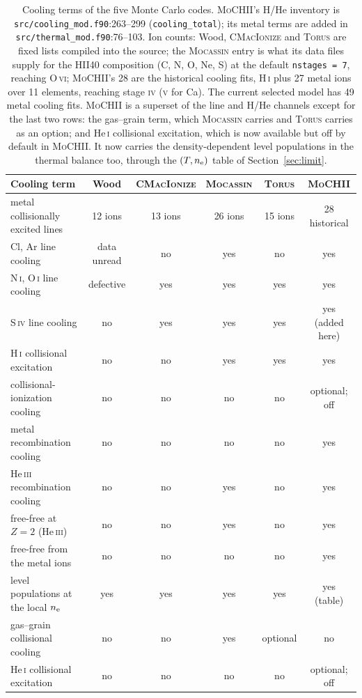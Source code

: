 \documentclass[english,a4paper]{my_memo}
\newcommand{\code}[1]{\texttt{#1}}
\newcommand{\MoCHII}{\textsc{MoCHII}}
\newcommand{\Mocassin}{\textsc{Mocassin}}
\newcommand{\CMI}{\textsc{CMacIonize}}
\newcommand{\Torus}{\textsc{Torus}}
\newcommand{\HI}{H\,\textsc{i}}
\newcommand{\HeI}{He\,\textsc{i}}
\newcommand{\HeIII}{He\,\textsc{iii}}
\newcommand{\OI}{O\,\textsc{i}}
\newcommand{\NI}{N\,\textsc{i}}
\newcommand{\SIV}{S\,\textsc{iv}}
\newcommand{\nel}{n_{\rm e}}
\begin{document}
\begin{table}[htbp]
\centering
\caption{Cooling terms of the five Monte Carlo codes.  \MoCHII{}'s H/He
inventory is \code{src/cooling\_mod.f90}:263--299 (\code{cooling\_total});
its metal terms are added in \code{src/thermal\_mod.f90}:76--103.  Ion counts: Wood, \CMI{}
and \Torus{} are fixed lists compiled into the source; the \Mocassin{} entry is
what its data files supply for
the HII40 composition (C, N, O, Ne, S) at the default \code{nstages = 7},
reaching O\,\textsc{vi}; \MoCHII{}'s 28 are the historical cooling fits,
\HI{} plus 27 metal ions over 11 elements, reaching stage \textsc{iv}
(\textsc{v} for Ca). The current selected model has 49 metal cooling fits.
\MoCHII{} is a superset of the line and
H/He channels except for the last two rows: the gas--grain term,
which \Mocassin{} carries and \Torus{} carries as an option; and \HeI{}
collisional excitation, which is now available but off by default in
\MoCHII{}. It now carries the
density-dependent level populations in the thermal balance too, through the
$(T, \nel)$ table of Section~\ref{sec:limit}.}
\label{tab:codes}
\footnotesize
\begin{tabular}{lccccc}
\toprule
Cooling term & Wood & \CMI{} & \Mocassin{} & \Torus{} & \MoCHII{} \\
\midrule
metal collisionally excited lines & 12 ions & 13 ions & 26 ions & 15 ions & 28 historical \\
Cl, Ar line cooling      & data unread & no & yes & no & yes \\
\NI{}, \OI{} line cooling & defective & yes & yes & yes & yes \\
\SIV{} line cooling      & no  & yes & yes & yes & yes (added here) \\
\HI{} collisional excitation & no & no & yes & yes & yes \\
collisional-ionization cooling & no & no & no & no & optional; off \\
metal recombination cooling & no & no & no & no & yes \\
\HeIII{} recombination cooling & no & no & yes & no & yes \\
free-free at $Z = 2$ (\HeIII{}) & no & no & yes & no & yes \\
free-free from the metal ions & no & no & no & no & yes \\
level populations at the local $\nel$ & yes & yes & yes & yes & yes (table) \\
gas--grain collisional cooling & no & no & yes & optional & no \\
\HeI{} collisional excitation & no & no & no & no & optional; off \\
\bottomrule
\end{tabular}
\end{table}
\end{document}
